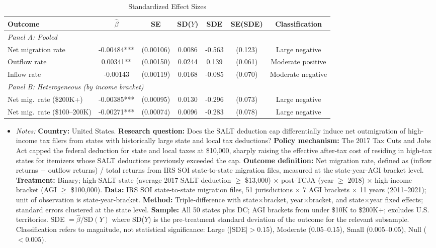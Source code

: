 \begin{table}[htbp]
\centering
\caption{Standardized Effect Sizes}
\label{tab:sde}
\footnotesize
\begin{tabular}{lcccccc}
\toprule
Outcome & $\hat{\beta}$ & SE & SD($Y$) & SDE & SE(SDE) & Classification \\
\midrule
\multicolumn{7}{l}{\textit{Panel A: Pooled}} \\
Net migration rate & -0.00484*** & (0.00106) & 0.0086 & -0.563 & (0.123) & Large negative \\
Outflow rate & 0.00341** & (0.00150) & 0.0244 & 0.139 & (0.061) & Moderate positive \\
Inflow rate & -0.00143 & (0.00119) & 0.0168 & -0.085 & (0.070) & Moderate negative \\
\multicolumn{7}{l}{\textit{Panel B: Heterogeneous (by income bracket)}} \\
Net mig.\ rate (\$200K+) & -0.00385*** & (0.00095) & 0.0130 & -0.296 & (0.073) & Large negative \\
Net mig.\ rate (\$100--200K) & -0.00271*** & (0.00074) & 0.0096 & -0.283 & (0.078) & Large negative \\
\bottomrule
\end{tabular}
\par\vspace{0.3em}
\begin{minipage}{\textwidth}
\footnotesize
\begin{itemize}[leftmargin=*]
\item \textit{Notes:} \textbf{Country:} United States. \textbf{Research question:} Does the SALT deduction cap differentially induce net outmigration of high-income tax filers from states with historically large state and local tax deductions? \textbf{Policy mechanism:} The 2017 Tax Cuts and Jobs Act capped the federal deduction for state and local taxes at \$10,000, sharply raising the effective after-tax cost of residing in high-tax states for itemizers whose SALT deductions previously exceeded the cap. \textbf{Outcome definition:} Net migration rate, defined as (inflow returns $-$ outflow returns) / total returns from IRS SOI state-to-state migration files, measured at the state-year-AGI bracket level. \textbf{Treatment:} Binary; high-SALT state (average 2017 SALT deduction $\geq$ \$13,000) $\times$ post-TCJA (year $\geq$ 2018) $\times$ high-income bracket (AGI $\geq$ \$100,000). \textbf{Data:} IRS SOI state-to-state migration files, 51 jurisdictions $\times$ 7 AGI brackets $\times$ 11 years (2011--2021); unit of observation is state-year-bracket. \textbf{Method:} Triple-difference with state$\times$bracket, year$\times$bracket, and state$\times$year fixed effects; standard errors clustered at the state level. \textbf{Sample:} All 50 states plus DC; AGI brackets from under \$10K to \$200K+; excludes U.S. territories. SDE $= \hat{\beta} / \text{SD}(Y)$ where SD($Y$) is the pre-treatment standard deviation of the outcome for the relevant subsample. Classification refers to magnitude, not statistical significance: Large ($|$SDE$| > 0.15$), Moderate ($0.05$--$0.15$), Small ($0.005$--$0.05$), Null ($< 0.005$).
\end{itemize}
\end{minipage}
\end{table}
